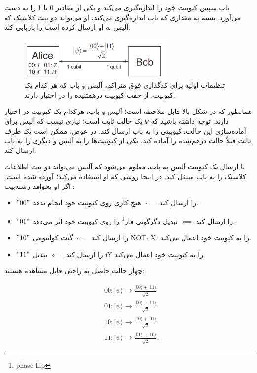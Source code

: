 \documentclass{book}
\begin{document}
باب سپس کیوبیت خود را اندازه‌گیری می‌کند و یکی از مقادیر 0 یا 1 را به دست می‌آورد. بسته به مقداری که باب اندازه‌گیری می‌کند، او می‌تواند دو بیت کلاسیک که آلیس به او ارسال کرده است را بازیابی کند.
\pagebreak

\begin{center}
	\begin{figure}[htbp]
		\centering
		\includegraphics[width=3in]{super dence.png}
		\caption{تنظیمات اولیه برای کدگذاری فوق متراکم، آلیس و باب که هر کدام یک کیوبیت، از جفت کیوبیت درهمتنیده را در اختیار دارند.}
		\label{fig:myimage}
	\end{figure}
\end{center}

همانطور که در شکل بالا قابل ملاحظه است؛ آلیس و باب، هرکدام یک کیوبیت در اختیار دارند. توجه داشته باشید که $\Psi$ یک حالت ثابت است؛ نیازی نیست که آلیس برای آماده‌سازی این حالت، کیوبیتی را به باب ارسال کند. در عوض، ممکن است یک طرف ثالث قبلاً حالت درهم‌تنیده را آماده کند، یکی از کیوبیت‌ها را به آلیس و دیگری را به باب ارسال کند.

با ارسال تک کیوبیت آلیس  به باب، معلوم می‌شود که آلیس می‌تواند دو بیت اطلاعات کلاسیک را به باب منتقل کند. در اینجا روشی که او استفاده می‌کند؛ آورده شده است. اگر او بخواهد رشته‌بیت :

\begin{itemize}
	\item  $"00"$ را ارسال کند $\impliedby$ هیچ کاری روی کیوبیت خود انجام ندهد.
	\item $"01"$ را ارسال کند $\impliedby$ تبدیل دگرگونی فاز\footnote{phase flip} را روی کیوبیت خود اثر می‌دهد.
	\item  $"10"$ را ارسال کند $\impliedby$ گیت کوانتومی NOT، X، را به کیوبیت خود اعمال می‌کند.
	\item  $"11"$ را ارسال کند $\impliedby$ تبدیل iY را به کیوبیت خود اعمال می‌کند.
\end{itemize}
چهار حالت حاصل به راحتی قابل مشاهده هستند:
\begin{center}
$$\begin{aligned}
	& 00:|\psi\rangle \rightarrow \frac{|00\rangle+|11\rangle}{\sqrt{2}} \\
	& 01:|\psi\rangle \rightarrow \frac{|00\rangle-|11\rangle}{\sqrt{2}} \\
	& 10:|\psi\rangle \rightarrow \frac{|10\rangle+|01\rangle}{\sqrt{2}} \\
	& 11:|\psi\rangle \rightarrow \frac{|01\rangle-|10\rangle}{\sqrt{2}} .
\end{aligned}$$	
\end{center}
\end{document}
